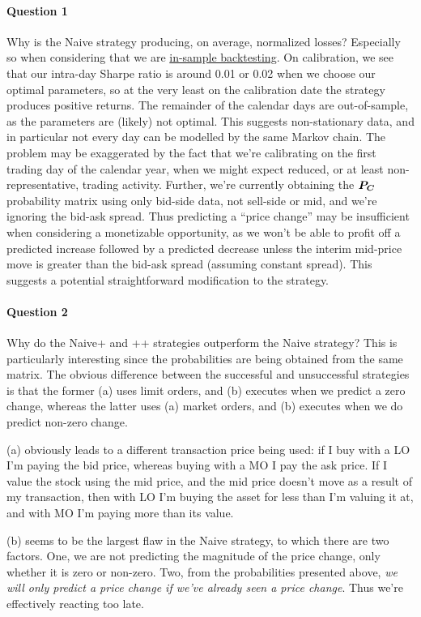\paragraph{Question 1} Why is the Naive strategy producing, on average, normalized losses? Especially so when considering that we are \underline{in-sample backtesting}. On calibration, we see that our intra-day Sharpe ratio is around 0.01 or 0.02 when we choose our optimal parameters, so at the very least on the calibration date the strategy produces positive returns. The remainder of the calendar days are out-of-sample, as the parameters are (likely) not optimal. This suggests non-stationary data, and in particular not every day can be modelled by the same Markov chain. The problem may be exaggerated by the fact that we're calibrating on the first trading day of the calendar year, when we might expect reduced, or at least non-representative, trading activity. Further, we're currently obtaining the $\boldsymbol{P_C}$ probability matrix using only bid-side data, not sell-side or mid, and we're ignoring the bid-ask spread. Thus predicting a ``price change'' may be insufficient when considering a monetizable opportunity, as we won't be able to profit off a predicted increase followed by a predicted decrease unless the interim mid-price move is greater than the bid-ask spread (assuming constant spread). This suggests a potential straightforward modification to the strategy.

\paragraph{Question 2} Why do the Naive+ and ++ strategies outperform the Naive strategy? This is particularly interesting since the probabilities are being obtained from the same matrix. The obvious difference between the successful and unsuccessful strategies is that the former (a) uses limit orders, and (b) executes when we predict a zero change, whereas the latter uses (a) market orders, and (b) executes when we do predict non-zero change.

(a) obviously leads to a different transaction price being used: if I buy with a LO I'm paying the bid price, whereas buying with a MO I pay the ask price. If I value the stock using the mid price, and the mid price doesn't move as a result of my transaction, then with LO I'm buying the asset for less than I'm valuing it at, and with MO I'm paying more than its value.

(b) seems to be the largest flaw in the Naive strategy, to which there are two factors. One, we are not predicting the magnitude of the price change, only whether it is zero or non-zero. Two, from the probabilities presented above, \textit{we will only predict a price change if we've already seen a price change}. Thus we're effectively reacting too late. 

